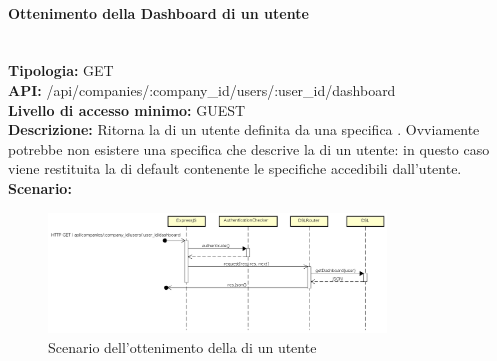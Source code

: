 \newpage
\paragraph{Ottenimento della Dashboard di un utente}\mbox{}\\
\textbf{Tipologia:} GET \\
\textbf{API:} /api/companies/:company\_id/users/:user\_id/dashboard \\
\textbf{Livello di accesso minimo:} GUEST \\
\textbf{Descrizione:} Ritorna la  di un utente definita da una specifica . Ovviamente potrebbe non esistere una specifica  che descrive la  di un utente: in questo caso viene restituita la  di default contenente le specifiche  accedibili dall'utente. \\
\textbf{Scenario:}  
\begin{figure}[H]
\centering
\includegraphics[width=0.8\textwidth]{res/sections/backend/sequence/(GET)dashboard.png}
\caption{Scenario dell'ottenimento della  di un utente}
\end{figure}

\newpage

